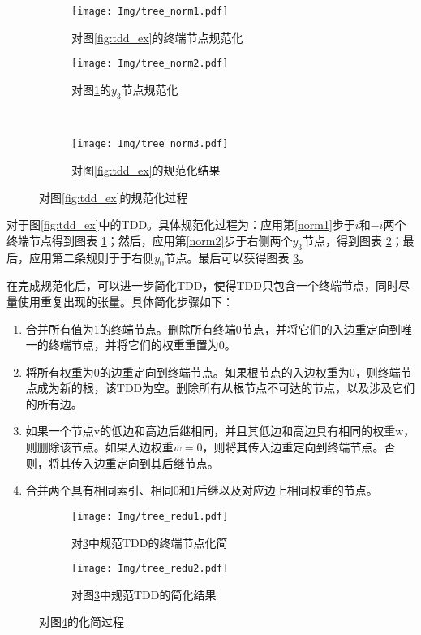 \begin{figure}[!htbp]
    \centering
    \begin{subfigure}[b]{0.4\textwidth}
        \centering
        \texttt{[image: Img/tree\_norm1.pdf]}
        \caption{对图\ref{fig:tdd_ex}的终端节点规范化}
        \label{fig:tdd-norma}
    \end{subfigure}
    \begin{subfigure}[b]{0.4\textwidth}
        \centering
        \texttt{[image: Img/tree\_norm2.pdf]}
        \caption{对图\ref{fig:tdd-norma}的$y_3$节点规范化}
        \label{fig:tdd-normb}
    \end{subfigure}
    \\
    \begin{subfigure}[b]{0.8\textwidth}
        \centering
        \texttt{[image: Img/tree\_norm3.pdf]}
        \caption{对图\ref{fig:tdd_ex}的规范化结果}
        \label{fig:tdd-normc}
    \end{subfigure}
    \caption{对图\ref{fig:tdd_ex}的规范化过程}
    \label{fig:tdd-norm}
\end{figure}
对于图\ref{fig:tdd_ex}中的TDD。具体规范化过程为：应用第\ref{norm1}步于$i$和$-i$两个终端节点得到图表 \ref{fig:tdd-norma}；然后，应用第\ref{norm2}步于右侧两个$y_3$节点，得到图表 \ref{fig:tdd-normb}；最后，应用第二条规则于于右侧$y_0$节点。最后可以获得图表 \ref{fig:tdd-normc}。

在完成规范化后，可以进一步简化TDD，使得TDD只包含一个终端节点，同时尽量使用重复出现的张量。具体简化步骤如下：
\begin{enumerate}
    \item 	合并所有值为1的终端节点。删除所有终端$0$节点，并将它们的入边重定向到唯一的终端节点，并将它们的权重重置为$0$。\label{sympl1}
	\item 将所有权重为$0$的边重定向到终端节点。如果根节点的入边权重为$0$，则终端节点成为新的根，该TDD为空。删除所有从根节点不可达的节点，以及涉及它们的所有边。\label{sympl2}
	\item 如果一个节点v的低边和高边后继相同，并且其低边和高边具有相同的权重w，则删除该节点。如果入边权重$w=0$，则将其传入边重定向到终端节点。否则，将其传入边重定向到其后继节点。\label{sympl3}
	\item 合并两个具有相同索引、相同$0$和$1$后继以及对应边上相同权重的节点。\label{sympl4}
\end{enumerate}

\begin{figure}[!htbp]
    \centering
    \begin{subfigure}[b]{0.4\textwidth}
        \centering
        \texttt{[image: Img/tree\_redu1.pdf]}
        \caption{对\ref{fig:tdd-normc}中规范TDD的终端节点化简}
        \label{fig:tdd-redu1}
    \end{subfigure}
    \begin{subfigure}[b]{0.4\textwidth}
        \centering
        \texttt{[image: Img/tree\_redu2.pdf]}
        \caption{对图\ref{fig:tdd-normc}中规范TDD的简化结果}
        \label{fig:tdd-redu2}
    \end{subfigure}
    \caption{对图\ref{fig:tdd-norm}的化简过程}
    \label{fig:tdd-redu}
\end{figure}

